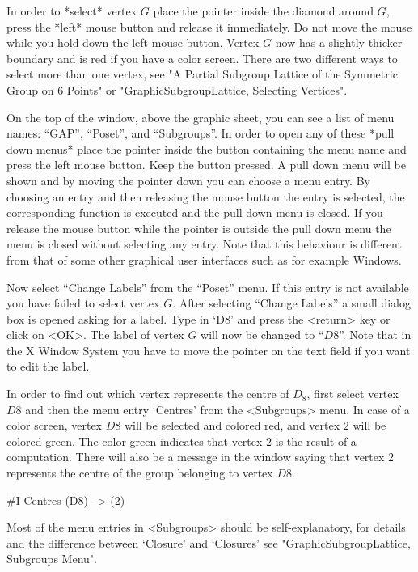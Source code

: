 In  order to *select* vertex $G$  place the pointer inside the diamond
around $G$, press the *left* mouse button  and release it immediately. 
Do  not move the  mouse  while you hold down  the  left mouse button.  
Vertex $G$ now has a slightly thicker boundary and is  red if you have
a color screen.  There are two different ways  to select more than one
vertex,  see "A Partial  Subgroup Lattice of  the Symmetric Group on 6
Points" or "GraphicSubgroupLattice, Selecting Vertices".

On the top of the window, above the graphic sheet, you  can see a list
of  menu names:  ``GAP'',  ``Poset'', and ``Subgroups''.   In order to
open  any of  these *pull down  menus*  place  the pointer inside  the
button containing the menu name and press the left mouse button.  Keep
the button pressed.  A pull down menu will  be shown and by moving the
pointer down  you can choose  a menu entry.   By choosing an entry and
then  releasing    the mouse   button the   entry    is  selected, the
corresponding function is  executed and the  pull down menu is closed. 
If you release the mouse button while the  pointer is outside the pull
down  menu the menu  is closed without selecting  any entry. Note that
this   behaviour is different from that   of some other graphical user
interfaces such as for example Windows.

Now  select ``Change Labels'' from the  ``Poset'' menu.  If this entry
is not   available  you have  failed to    select vertex  $G$.   After
selecting ``Change Labels'' a small dialog box is  opened asking for a
label.  Type in `D8' and press the <return> key or click on <OK>.  The
label of vertex $G$ will now be changed to ``$D8$''. Note that in the
X Window System you have to move the pointer on  the text field if you
want to edit the label.

In  order to find  out which  vertex represents the  centre  of $D_8$,
first select vertex $D8$ and then the  menu entry `Centres' from the
<Subgroups> menu.  In case of  a color screen,  vertex $D8$ will  be
selected and colored  red, and vertex $2$  will be colored green.  The
color green indicates that vertex $2$ is the result  of a computation. 
There will also be a message  in the {\GAP}  window saying that vertex
$2$ represents the centre of the group belonging to vertex $D8$.

\begintt
#I  Centres (D8) --> (2)
\endtt

Most of  the menu entries  in <Subgroups> should be self-explanatory, for
details and  the   difference   between  `Closure'  and    `Closures' see
"GraphicSubgroupLattice, Subgroups Menu".


